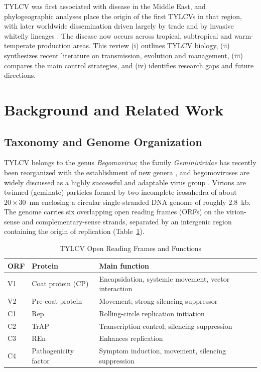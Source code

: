 \documentclass[journal]{IEEEtran}
\begin{document}
TYLCV was first associated with disease in the Middle East, and phylogeographic analyses place the origin of the first TYLCVs in that region, with later worldwide dissemination driven largely by trade and by invasive whitefly lineages \cite{marchant2023}. The disease now occurs across tropical, subtropical and warm-temperate production areas. This review (i) outlines TYLCV biology, (ii) synthesizes recent literature on transmission, evolution and management, (iii) compares the main control strategies, and (iv) identifies research gaps and future directions.

\section{Background and Related Work}
\subsection{Taxonomy and Genome Organization}
TYLCV belongs to the genus \textit{Begomovirus}; the family \textit{Geminiviridae} has recently been reorganized with the establishment of new genera \cite{roumagnac2022}, and begomoviruses are widely discussed as a highly successful and adaptable virus group \cite{fiallo2023}. Virions are twinned (geminate) particles formed by two incomplete icosahedra of about $20\times30$~nm enclosing a circular single-stranded DNA genome of roughly 2.8~kb. The genome carries six overlapping open reading frames (ORFs) on the virion-sense and complementary-sense strands, separated by an intergenic region containing the origin of replication (Table~\ref{tab:orf}).

\begin{table}[!t]
\caption{TYLCV Open Reading Frames and Functions}
\label{tab:orf}
\centering
\small
\begin{tabularx}{\columnwidth}{@{}l l X@{}}
\toprule
ORF & Protein & Main function \\
\midrule
V1 & Coat protein (CP) & Encapsidation, systemic movement, vector interaction \\
V2 & Pre-coat protein & Movement; strong silencing suppressor \\
C1 & Rep & Rolling-circle replication initiation \\
C2 & TrAP & Transcription control; silencing suppression \\
C3 & REn & Enhances replication \\
C4 & Pathogenicity factor & Symptom induction, movement, silencing suppression \\
\bottomrule
\end{tabularx}
\end{table}
\end{document}
